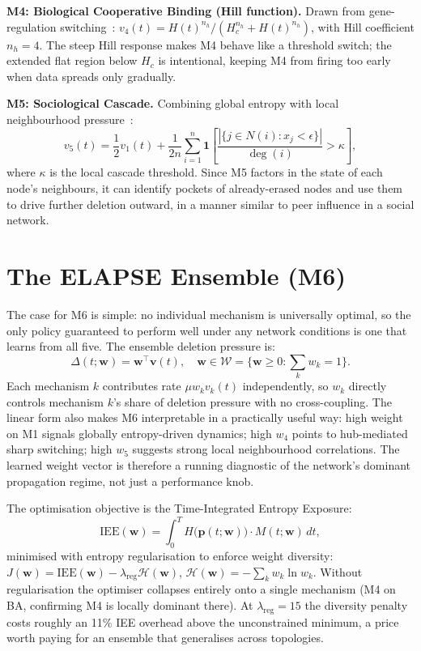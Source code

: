 \documentclass[conference]{IEEEtran}
\newcommand{\ind}{\mathbf{1}}
\newcommand{\bfw}{\mathbf{w}}
\newcommand{\bfv}{\mathbf{v}}
\newcommand{\IEE}{\mathrm{IEE}}
\newcommand{\Hc}{H_c}
\begin{document}
\textbf{M4: Biological Cooperative Binding (Hill function).}
Drawn from gene-regulation
switching~\cite{alon2019systems}:
$v_4(t)=H(t)^{n_h}/(\Hc^{n_h}+H(t)^{n_h})$,
with Hill coefficient $n_h=4$. The steep Hill response makes M4
behave like a threshold switch; the extended flat region below
$\Hc$ is intentional, keeping M4 from firing too early when
data spreads only gradually.

\textbf{M5: Sociological Cascade.}
Combining global entropy with local neighbourhood
pressure~\cite{watts2002simple}:
\begin{equation}
  v_5(t)=\frac{1}{2}v_1(t)
  +\frac{1}{2n}\sum_{i=1}^n\ind\!\left[
    \frac{|\{j\in N(i):x_j<\epsilon\}|}{\deg(i)}>\kappa\right]\!,
\end{equation}
where $\kappa$ is the local cascade threshold. Since M5 factors
in the state of each node's neighbours, it can identify pockets
of already-erased nodes and use them to drive further deletion
outward, in a manner similar to peer influence in a social network.

\section{The ELAPSE Ensemble (M6)}
\label{sec:ensemble}

The case for M6 is simple: no individual mechanism is universally
optimal, so the only policy guaranteed to perform well under any
network conditions is one that learns from all five.  The ensemble
deletion pressure is:
\begin{equation}
  \Delta(t;\bfw)=\bfw^\top\bfv(t),\quad
  \bfw\in\mathcal{W}=\bigl\{\bfw\geq 0:\textstyle\sum_k w_k=1\bigr\}.
  \label{eq:ensemble}
\end{equation}
Each mechanism $k$ contributes rate $\mu w_k v_k(t)$ independently,
so $w_k$ directly controls mechanism $k$'s share of deletion pressure
with no cross-coupling.  The linear form also makes M6 interpretable
in a practically useful way: high weight on M1 signals globally
entropy-driven dynamics; high $w_4$ points to hub-mediated sharp
switching; high $w_5$ suggests strong local neighbourhood
correlations.  The learned weight vector is therefore a running
diagnostic of the network's dominant propagation regime, not just
a performance knob.

The optimisation objective is the Time-Integrated Entropy Exposure:
\begin{equation}
  \IEE(\bfw)=\int_0^T H\!\bigl(\mathbf{p}(t;\bfw)\bigr)
             \cdot M(t;\bfw)\,dt,
  \label{eq:iee}
\end{equation}
minimised with entropy regularisation to enforce weight diversity:
$J(\bfw)=\IEE(\bfw)-\lambda_{\mathrm{reg}}\mathcal{H}(\bfw)$,
$\mathcal{H}(\bfw)=-\sum_k w_k\ln w_k$.
Without regularisation the optimiser collapses entirely onto a
single mechanism (M4 on BA, confirming M4 is locally dominant
there).  At $\lambda_{\mathrm{reg}}=15$ the diversity penalty costs
roughly an 11\% IEE overhead above the unconstrained minimum, a
price worth paying for an ensemble that generalises across topologies.
\end{document}

